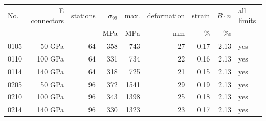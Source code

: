 \begin{tabular}{@{}lrrrrrrrl@{}}\toprule
No. & E connectors & stations & $\sigma_{99}$ & max. & deformation & strain & $B\cdot n$ & all limits \\
 & & & MPa & MPa & mm & \% & ‰ & \\\midrule
0105 & 50 GPa & 64 & \num{358} & \num{743} & \num{27} & \num{0.17} & \num{2.13} & yes \\
0110 & 100 GPa & 64 & \num{331} & \num{734} & \num{22} & \num{0.16} & \num{2.13} & yes \\
0114 & 140 GPa & 64 & \num{318} & \num{725} & \num{21} & \num{0.15} & \num{2.13} & yes \\
0205 & 50 GPa & 96 & \num{372} & \num{1541} & \num{29} & \num{0.19} & \num{2.13} & yes \\
0210 & 100 GPa & 96 & \num{343} & \num{1398} & \num{25} & \num{0.18} & \num{2.13} & yes \\
0214 & 140 GPa & 96 & \num{330} & \num{1323} & \num{23} & \num{0.17} & \num{2.13} & yes \\
\bottomrule\end{tabular}

